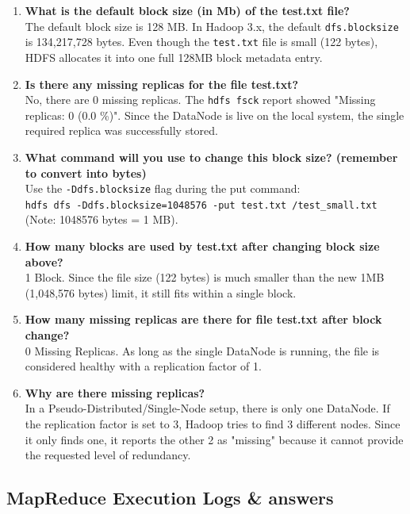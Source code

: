 \documentclass{article}
\begin{document}
\begin{enumerate}
    \item \textbf{What is the default block size (in Mb) of the test.txt file?} \\
    The default block size is 128 MB. In Hadoop 3.x, the default \texttt{dfs.blocksize} is 134,217,728 bytes. Even though the \texttt{test.txt} file is small (122 bytes), HDFS allocates it into one full 128MB block metadata entry.
    \item \textbf{Is there any missing replicas for the file test.txt?} \\
    No, there are 0 missing replicas. The \texttt{hdfs fsck} report showed "Missing replicas: 0 (0.0 \%)". Since the DataNode is live on the local system, the single required replica was successfully stored.
    \item \textbf{What command will you use to change this block size? (remember to convert into bytes)} \\
    Use the \texttt{-Ddfs.blocksize} flag during the put command:\\
    \texttt{hdfs dfs -Ddfs.blocksize=1048576 -put test.txt /test\_small.txt}\\
    (Note: 1048576 bytes = 1 MB).
    \item \textbf{How many blocks are used by test.txt after changing block size above?} \\
    1 Block. Since the file size (122 bytes) is much smaller than the new 1MB (1,048,576 bytes) limit, it still fits within a single block.
    \item \textbf{How many missing replicas are there for file test.txt after block change?} \\
    0 Missing Replicas. As long as the single DataNode is running, the file is considered healthy with a replication factor of 1.
    \item \textbf{Why are there missing replicas?} \\
    In a Pseudo-Distributed/Single-Node setup, there is only one DataNode. If the replication factor is set to 3, Hadoop tries to find 3 different nodes. Since it only finds one, it reports the other 2 as "missing" because it cannot provide the requested level of redundancy.
\end{enumerate}

\subsection*{MapReduce Execution Logs \& answers}
\end{document}
